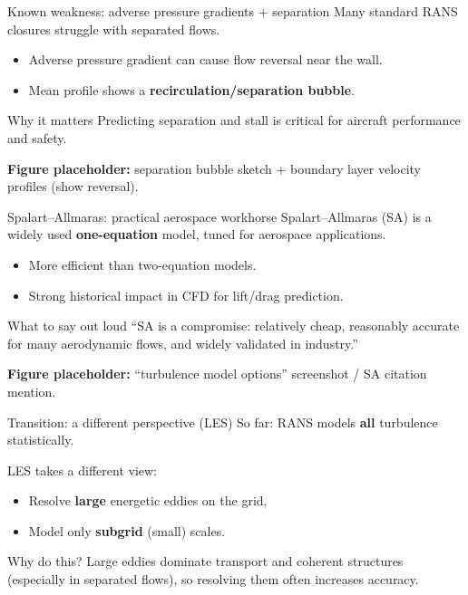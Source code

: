 \documentclass[aspectratio=169]{beamer}
\begin{document}
\begin{frame}{Known weakness: adverse pressure gradients + separation}
Many standard RANS closures struggle with separated flows.

\begin{itemize}
  \item Adverse pressure gradient can cause flow reversal near the wall.
  \item Mean profile shows a \textbf{recirculation/separation bubble}.
\end{itemize}

\begin{block}{Why it matters}
Predicting separation and stall is critical for aircraft performance and safety.
\end{block}

\textbf{Figure placeholder:} separation bubble sketch + boundary layer velocity profiles (show reversal).
\end{frame}

\begin{frame}{Spalart--Allmaras: practical aerospace workhorse}
Spalart--Allmaras (SA) is a widely used \textbf{one-equation} model, tuned for aerospace applications.

\begin{itemize}
  \item More efficient than two-equation models.
  \item Strong historical impact in CFD for lift/drag prediction.
\end{itemize}

\begin{block}{What to say out loud}
``SA is a compromise: relatively cheap, reasonably accurate for many aerodynamic flows, and widely validated in industry.''
\end{block}

\textbf{Figure placeholder:} ``turbulence model options'' screenshot / SA citation mention.
\end{frame}

\begin{frame}{Transition: a different perspective (LES)}
So far: RANS models \textbf{all} turbulence statistically.

LES takes a different view:
\begin{itemize}
  \item Resolve \textbf{large} energetic eddies on the grid,
  \item Model only \textbf{subgrid} (small) scales.
\end{itemize}

\begin{block}{Why do this?}
Large eddies dominate transport and coherent structures (especially in separated flows),
so resolving them often increases accuracy.
\end{block}
\end{frame}
\end{document}
